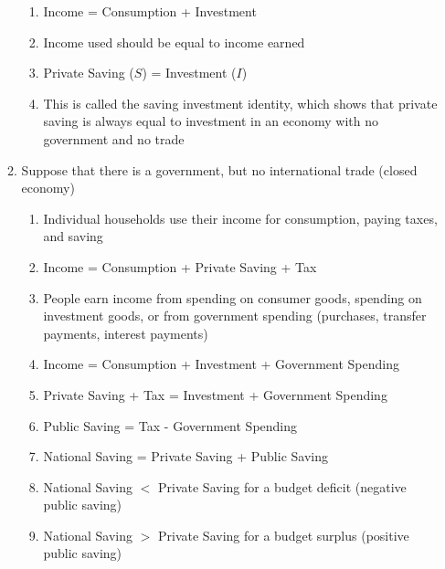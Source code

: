 \documentclass[12pt]{article}
\begin{document}
\begin{enumerate}
\begin{enumerate}
\begin{enumerate}
              \item Income = Consumption + Investment

              \item Income used should be equal to income earned

              \item Private Saving ($S$) = Investment ($I$)

              \item This is called the saving investment identity, which shows that private saving is always equal to investment in an economy with no government and no trade

            \end{enumerate}

          \item Suppose that there is a government, but no international trade (closed economy)

            \begin{enumerate}

              \item Individual households use their income for consumption, paying taxes, and saving

              \item Income = Consumption + Private Saving + Tax

              \item People earn income from spending on consumer goods, spending on investment goods, or from government spending (purchases, transfer payments, interest payments)

              \item Income = Consumption + Investment + Government Spending

              \item Private Saving + Tax = Investment + Government Spending

              \item Public Saving = Tax - Government Spending

              \item National Saving = Private Saving + Public Saving

              \item National Saving $<$ Private Saving for a budget deficit (negative public saving)

              \item National Saving $>$ Private Saving for a budget surplus (positive public saving)


\end{enumerate}
\end{enumerate}
\end{enumerate}
\end{document}
